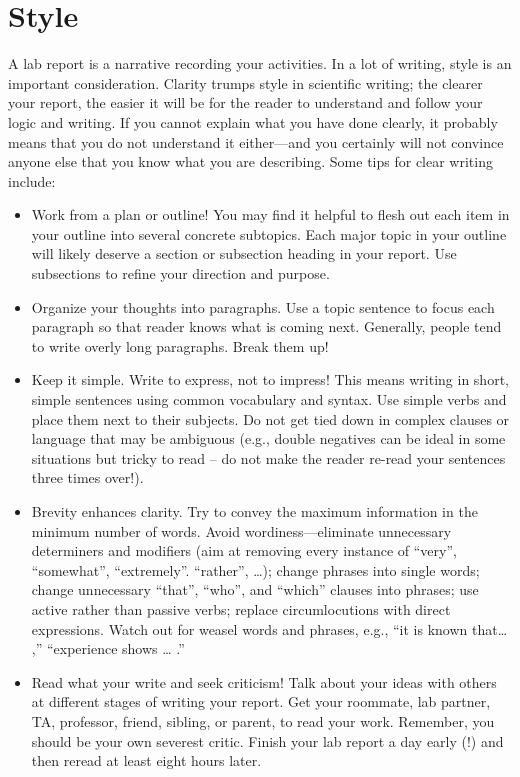 \documentclass[12pt,preprint]{aastex}
\begin{document}
\section{Style}

\noindent
A lab report is a narrative recording your activities. In a lot of writing, style is an important consideration. Clarity trumps style in scientific writing; the clearer your report, the easier it will be for the reader to understand and follow your logic and writing. If you cannot explain what you have done clearly, it probably means that you do not understand it either—and you certainly will not convince anyone else that you know what you are describing. Some tips for clear writing include:
\begin{itemize}
\item Work from a plan or outline! You may find it helpful to flesh out each item in your outline into several concrete subtopics. Each major topic in your outline will likely deserve a section or subsection heading in your report. Use subsections to refine your direction and purpose.
\item Organize your thoughts into paragraphs. Use a topic sentence to focus each paragraph so that reader knows what is coming next.  Generally, people tend to write overly long paragraphs. Break them up!
\item Keep it simple. Write to express, not to impress! This means writing in short, simple sentences using common vocabulary and syntax. Use simple verbs and place them next to their subjects. Do not get tied down in complex clauses or language that may be ambiguous (e.g., double negatives can be ideal in some situations but tricky to read – do not make the reader re-read your sentences three times over!).
\item Brevity enhances clarity. Try to convey the maximum information in the minimum number of words. Avoid wordiness—eliminate unnecessary determiners and modifiers (aim at removing every instance of “very”, “somewhat”, “extremely”. “rather”, …); change phrases into single words; change unnecessary “that”, “who”, and “which” clauses into phrases; use active rather than passive verbs; replace circumlocutions with direct expressions. Watch out for weasel words and phrases, e.g., “it is known that… ,” “experience shows … .”
\item Read what your write and seek criticism! Talk about your ideas with others at different stages of writing your report. Get your roommate, lab partner, TA, professor, friend, sibling, or parent, to read your work. Remember, you should be your own severest critic. Finish your lab report a day early (!) and then reread at least eight hours later.

\end{itemize}
\end{document}
